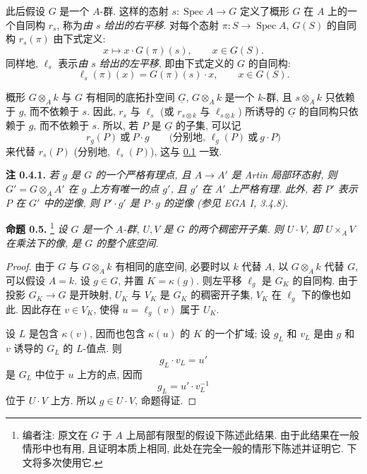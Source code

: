 此后假设 \(G\) 是一个 \(A\)-群.
这样的态射 \(s:\operatorname{Spec}A\to G\)
定义了概形 \(G\) 在 \(A\) 上的一个自同构 \(r_s\),
称为\emph{由 \(s\) 给出的右平移}.
对每个态射 \(\pi:S\to\operatorname{Spec}A\),
\(G(S)\) 的自同构 \(r_s(\pi)\) 由下式定义:
\[
  x\longmapsto x\cdot G(\pi)(s),
  \qquad x\in G(S).
\]
同样地, \(\ell_s\) 表示\emph{由 \(s\) 给出的左平移},
即由下式定义的 \(G\) 的自同构:
\[
  \ell_s(\pi)(x)=G(\pi)(s)\cdot x,
  \qquad x\in G(S).
\]

概形 \(G\otimes_A k\) 与 \(G\) 有相同的底拓扑空间
\(\underline G\), \(G\otimes_A k\) 是一个 \(k\)-群,
且 \(s\otimes_A k\) 只依赖于 \(g\), 而不依赖于 \(s\).
因此, \(r_s\) 与 \(\ell_s\)
(或 \(r_{s\otimes k}\) 与 \(\ell_{s\otimes k}\))
所诱导的 \(\underline G\) 的自同构只依赖于 \(g\), 而不依赖于 \(s\).
所以, 若 \(P\) 是 \(\underline G\) 的子集, 可以记
\[
  r_g(P)\ \text{或}\ P\cdot g
  \qquad
  \bigl(\text{分别地, }\ell_g(P)\ \text{或}\ g\cdot P\bigr)
\]
来代替 \(r_s(P)\) (分别地, \(\ell_s(P)\)),
这与 \hyperref[sga3:VIA:0.1]{0.1} 一致.

\medskip
\noindent\textbf{注 0.4.1.}
\label{sga3:VIA:0.4.1}
\textit{若 \(g\) 是 \(G\) 的一个严格有理点,
且 \(A\to A'\) 是 Artin 局部环态射,
则 \(G'=G\otimes_A A'\) 在 \(g\) 上方有唯一的点 \(g'\),
且 \(g'\) 在 \(A'\) 上严格有理.
此外, 若 \(P'\) 表示 \(P\) 在 \(G'\) 中的逆像,
则 \(P'\cdot g'\) 是 \(P\cdot g\) 的逆像 (参见 EGA I, 3.4.8).}

\medskip
\noindent{}\textbf{命题 0.5.}
\footnote{编者注: 原文在 \(G\) 于 \(A\) 上局部有限型的假设下陈述此结果.
由于此结果在一般情形中也有用, 且证明本质上相同,
此处在完全一般的情形下陈述并证明它. 下文将多次使用它.}
\label{sga3:VIA:0.5}
\textit{设 \(G\) 是一个 \(A\)-群,
\(U,V\) 是 \(G\) 的两个稠密开子集.
则 \(U\cdot V\), 即 \(U\times_A V\) 在乘法下的像,
是 \(G\) 的整个底空间.}

\begin{proof}
由于 \(G\) 与 \(G\otimes_A k\) 有相同的底空间,
必要时以 \(k\) 代替 \(A\), 以 \(G\otimes_A k\) 代替 \(G\),
可以假设 \(A=k\).
设 \(g\in G\), 并置 \(K=\kappa(g)\).
则左平移 \(\ell_g\) 是 \(G_K\) 的自同构.
由于投影 \(G_K\to G\) 是开映射,
\(U_K\) 与 \(V_K\) 是 \(G_K\) 的稠密开子集,
\(V_K\) 在 \(\ell_g\) 下的像也如此.
因此存在 \(v\in V_K\), 使得 \(u=\ell_g(v)\) 属于 \(U_K\).

设 \(L\) 是包含 \(\kappa(v)\), 因而也包含 \(\kappa(u)\) 的
\(K\) 的一个扩域; 设 \(g_L\) 和 \(v_L\) 是由 \(g\) 和 \(v\)
诱导的 \(G_L\) 的 \(L\)-值点. 则
\[
  g_L\cdot v_L=u'
\]
是 \(G_L\) 中位于 \(u\) 上方的点, 因而
\[
  g_L=u'\cdot v_L^{-1}
\]
位于 \(U\cdot V\) 上方.
所以 \(g\in U\cdot V\), 命题得证.
\end{proof}

